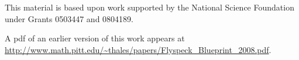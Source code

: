 \noindent

\bigskip\noindent
This material is based upon work supported by the National Science
Foundation under
Grants 0503447 and 0804189.

\bigskip\noindent\svninfo 

\bigskip\noindent
A pdf of an earlier version of this work appears at\hfill\break 
\url{http://www.math.pitt.edu/~thales/papers/Flyspeck_Blueprint_2008.pdf}.




\smallskip
\newpage

